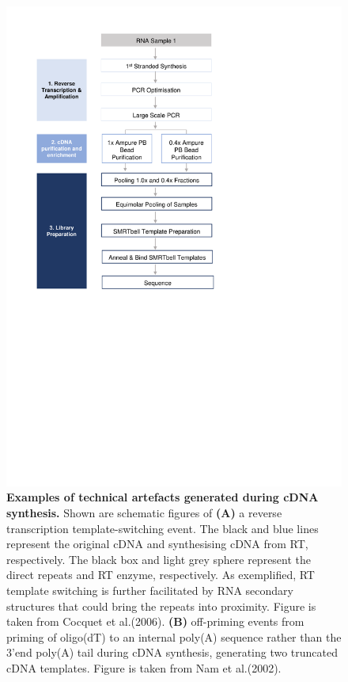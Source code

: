 \begin{figure}[h]
	\begin{center}
		\includegraphics[page=4,trim={2cm 21.5cm 0 1cm},clip, scale = 0.9]{Figures/ProjectDevelopment_Figures.pdf}
	\end{center}
	\captionsetup{width=0.95\textwidth}
	\caption[Examples of technical artefacts generated during cDNA synthesis]%
	{\textbf{Examples of technical artefacts generated during cDNA synthesis.} Shown are schematic figures of \textbf{(A)} a reverse transcription template-switching event. The black and blue lines represent the original cDNA and synthesising cDNA from RT, respectively. The black box and light grey sphere represent the direct repeats and RT enzyme, respectively. As exemplified, RT template switching is further facilitated by RNA secondary structures that could bring the repeats into proximity\cite{Cocquet2006}. Figure is taken from Cocquet et al.(2006)\cite{Cocquet2006}. \textbf{(B)} off-priming events from priming of oligo(dT) to an internal poly(A) sequence rather than the 3'end poly(A) tail during cDNA synthesis, generating two truncated cDNA templates. Figure is taken from Nam et al.(2002)\cite{Nam2002}. }
	\label{fig:lib_prep_artifacts}
\end{figure}

